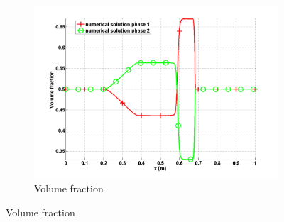 \documentclass{anstrans}
\begin{document}
\begin{figure}[H]
        \begin{subfigure}[b]{0.495\textwidth}
                \centering
                \includegraphics[width=\textwidth]{plots/relaxation_two_phases_volume_fraction.png}
                \caption{Volume fraction}
                \label{fig:volume_fraction}
        \end{subfigure}
\end{figure}
\end{document}
